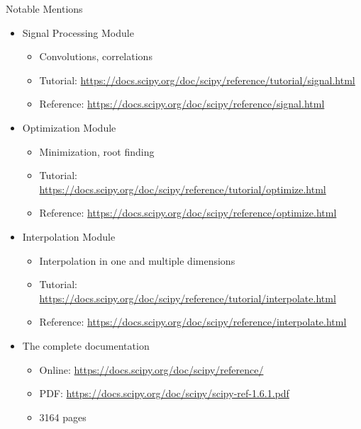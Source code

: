 
\begin{frame}{Notable Mentions}
%
\begin{itemize}
\item Signal Processing Module
	\begin{itemize}
	\item Convolutions, correlations
	\item Tutorial: {\scriptsize \url{https://docs.scipy.org/doc/scipy/reference/tutorial/signal.html}}
	\item Reference: {\scriptsize \url{https://docs.scipy.org/doc/scipy/reference/signal.html}}
	\end{itemize}
\item Optimization Module
	\begin{itemize}
	\item Minimization, root finding
	\item Tutorial: {\scriptsize \url{https://docs.scipy.org/doc/scipy/reference/tutorial/optimize.html}}
	\item Reference: {\scriptsize \url{https://docs.scipy.org/doc/scipy/reference/optimize.html}}
	\end{itemize}
\item Interpolation Module
	\begin{itemize}
	\item Interpolation in one and multiple dimensions
	\item Tutorial: {\scriptsize \url{https://docs.scipy.org/doc/scipy/reference/tutorial/interpolate.html}}
	\item Reference: {\scriptsize \url{https://docs.scipy.org/doc/scipy/reference/interpolate.html}}
	\end{itemize}
\item The complete documentation
	\begin{itemize}
	\item Online: {\scriptsize \url{https://docs.scipy.org/doc/scipy/reference/}}
	\item PDF: {\scriptsize \url{https://docs.scipy.org/doc/scipy/scipy-ref-1.6.1.pdf}}
	\item 3164 pages
	\end{itemize}
\end{itemize}
%
\end{frame}